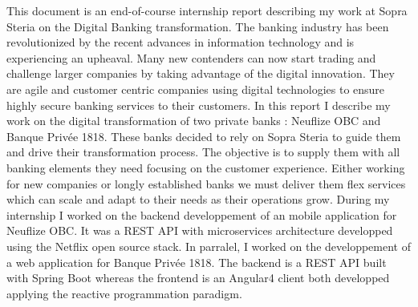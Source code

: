 	This document is an end-of-course internship report describing my work at Sopra Steria on the Digital Banking transformation. The banking industry has been revolutionized by the recent advances in information technology and is experiencing an upheaval. Many new contenders can now start trading and challenge larger companies by taking advantage of the digital innovation. They are agile and customer centric companies using digital technologies to ensure highly secure banking services to their customers. In this report I describe my work on the digital transformation of two private banks : Neuflize OBC and Banque Privée 1818. These banks decided to rely on Sopra Steria to guide them and drive their transformation process. The objective is to supply them with all banking elements they need focusing on the customer experience. Either working for new companies or longly established banks we must deliver them flex services which can scale and adapt to their needs as their operations grow. During my internship I worked on the backend developpement of an mobile application for Neuflize OBC. It was a REST API with microservices architecture developped using the Netflix open source stack. In parralel, I worked on the developpement of a web application for Banque Privée 1818. The backend is a REST API built with Spring Boot whereas the frontend is an Angular4 client both developped applying the reactive programmation paradigm.